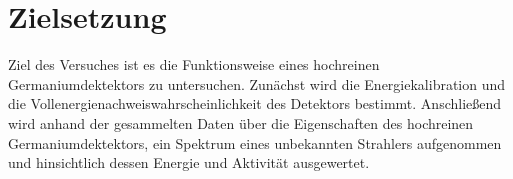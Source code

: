 \section{Zielsetzung}
\label{sec:zielsetzung}

Ziel des Versuches ist es die Funktionsweise eines hochreinen Germaniumdektektors zu untersuchen.
Zunächst wird die Energiekalibration und die Vollenergienachweiswahrscheinlichkeit des Detektors
bestimmt.
Anschließend wird anhand der gesammelten Daten über die Eigenschaften des hochreinen Germaniumdektektors,
ein Spektrum eines unbekannten Strahlers aufgenommen und hinsichtlich dessen Energie und Aktivität ausgewertet.